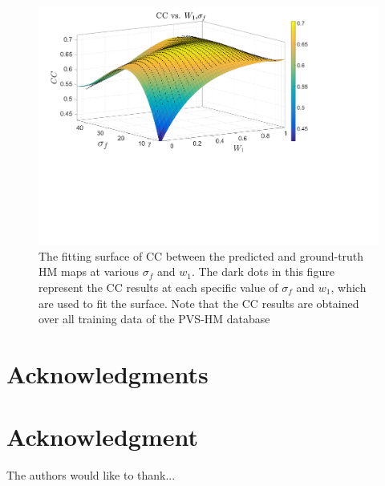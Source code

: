\documentclass[10pt,journal,compsoc]{IEEEtran}
\begin{document}
\begin{figure}
	\begin{center}
		\centerline{\includegraphics[width=\columnwidth]{figures/experiment/Fitting}}%
		\caption{\footnotesize{The fitting surface of CC between the predicted and ground-truth HM maps at various $\sigma_f$ and $w_1$. The dark dots in this figure represent the CC results at each specific value of $\sigma_f$ and $w_1$, which are used to fit the surface. Note that the CC results are obtained over all training data of the PVS-HM database}}
		\label{fitting_surface}
	\end{center}
\end{figure}





\ifCLASSOPTIONcompsoc
  \section*{Acknowledgments}
\else
  \section*{Acknowledgment}
\fi


The authors would like to thank...


\ifCLASSOPTIONcaptionsoff
  \newpage
\fi



\end{document}
